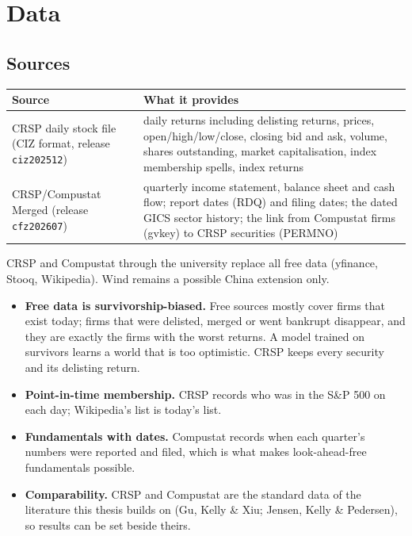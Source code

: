 \section{Data}
\label{sec:data}

\subsection{Sources}

\begin{tabularx}{\textwidth}{@{}>{\raggedright\arraybackslash}p{5cm}X@{}}
\toprule
Source & What it provides \\
\midrule
CRSP daily stock file (CIZ format, release \texttt{ciz202512}) & daily returns including delisting
returns, prices, open/high/low/close, closing bid and ask, volume, shares outstanding, market
capitalisation, index membership spells, index returns \\
CRSP/Compustat Merged (release \texttt{cfz202607}) & quarterly income statement, balance sheet and
cash flow; report dates (RDQ) and filing dates; the dated GICS sector history; the link from
Compustat firms (gvkey) to CRSP securities (PERMNO) \\
\bottomrule
\end{tabularx}

 CRSP and Compustat through the university replace all free data
(yfinance, Stooq, Wikipedia). Wind remains a possible China extension only.

\begin{whybox}
\begin{itemize}
\item \textbf{Free data is survivorship-biased.} Free sources mostly cover firms that exist today; firms that
  were delisted, merged or went bankrupt disappear, and they are exactly the firms with the worst returns.
  A model trained on survivors learns a world that is too optimistic. CRSP keeps every security and its
  delisting return.
\item \textbf{Point-in-time membership.} CRSP records who was in the S\&P 500 on each day; Wikipedia's list is
  today's list.
\item \textbf{Fundamentals with dates.} Compustat records when each quarter's numbers were reported and filed,
  which is what makes look-ahead-free fundamentals possible.
\item \textbf{Comparability.} CRSP and Compustat are the standard data of the literature this thesis builds on
  (Gu, Kelly \& Xiu; Jensen, Kelly \& Pedersen), so results can be set beside theirs.
\end{itemize}
\end{whybox}

